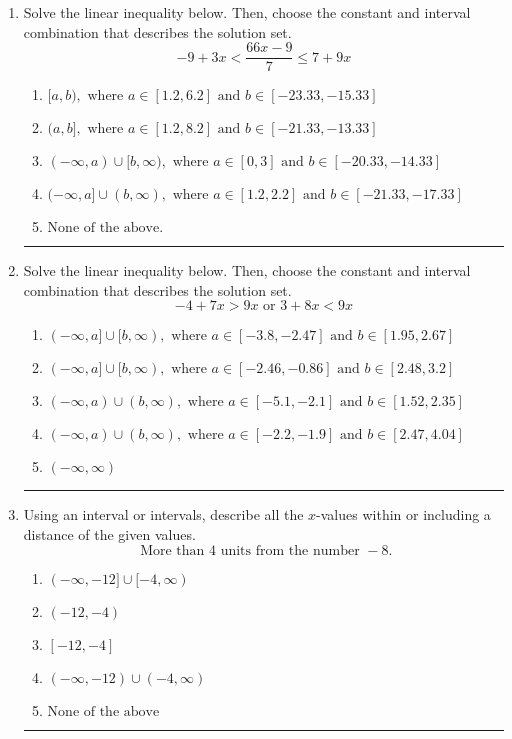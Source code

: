 \documentclass[14pt]{extbook}
\newcommand{\litem}[1]{\item#1\hspace*{-1cm}\rule{\textwidth}{0.4pt}}
\begin{document}
\begin{enumerate}
{\begin{enumerate}[label=\Alph*.]
\end{enumerate} }
\litem{
Solve the linear inequality below. Then, choose the constant and interval combination that describes the solution set.\[ -9 + 3 x < \frac{66 x - 9}{7} \leq 7 + 9 x \]\begin{enumerate}[label=\Alph*.]
\item \( [a, b), \text{ where } a \in [1.2, 6.2] \text{ and } b \in [-23.33, -15.33] \)
\item \( (a, b], \text{ where } a \in [1.2, 8.2] \text{ and } b \in [-21.33, -13.33] \)
\item \( (-\infty, a) \cup [b, \infty), \text{ where } a \in [0, 3] \text{ and } b \in [-20.33, -14.33] \)
\item \( (-\infty, a] \cup (b, \infty), \text{ where } a \in [1.2, 2.2] \text{ and } b \in [-21.33, -17.33] \)
\item \( \text{None of the above.} \)

\end{enumerate} }
\litem{
Solve the linear inequality below. Then, choose the constant and interval combination that describes the solution set.\[ -4 + 7 x > 9 x \text{ or } 3 + 8 x < 9 x \]\begin{enumerate}[label=\Alph*.]
\item \( (-\infty, a] \cup [b, \infty), \text{ where } a \in [-3.8, -2.47] \text{ and } b \in [1.95, 2.67] \)
\item \( (-\infty, a] \cup [b, \infty), \text{ where } a \in [-2.46, -0.86] \text{ and } b \in [2.48, 3.2] \)
\item \( (-\infty, a) \cup (b, \infty), \text{ where } a \in [-5.1, -2.1] \text{ and } b \in [1.52, 2.35] \)
\item \( (-\infty, a) \cup (b, \infty), \text{ where } a \in [-2.2, -1.9] \text{ and } b \in [2.47, 4.04] \)
\item \( (-\infty, \infty) \)

\end{enumerate} }
\litem{
Using an interval or intervals, describe all the $x$-values within or including a distance of the given values.\[ \text{ More than } 4 \text{ units from the number } -8. \]\begin{enumerate}[label=\Alph*.]
\item \( (-\infty, -12] \cup [-4, \infty) \)
\item \( (-12, -4) \)
\item \( [-12, -4] \)
\item \( (-\infty, -12) \cup (-4, \infty) \)
\item \( \text{None of the above} \)


\end{enumerate}}
\end{enumerate}
\end{document}
